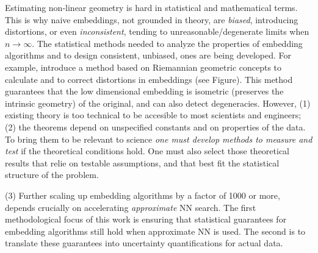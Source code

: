 \documentclass[floatfix,11pt]{article}
\begin{document}
Estimating non-linear geometry is hard in statistical and mathematical terms. This is why na{i}ve embeddings, not grounded in theory, are {\em biased}, introducing distortions, or even {\em inconsistent}, tending to unreasonable/degenerate limits when $n\rightarrow \infty$. The statistical methods needed to analyze the properties of embedding algorithms and to design consistent, unbiased, ones are being developed. For example, \cite{2013arXiv1305.7255P} introduce a method based on Riemannian geometric concepts to calculate and to correct distortions in embeddings (see Figure). This method guarantees that the low dimensional embedding is isometric (preserves the intrinsic geometry) of the original, and can also detect degeneracies. 
However, (1) existing theory is too technical to be accesible to most scientists and engineers; (2) the theorems depend on unspecified constants and on properties of the data. To bring them to be relevant to science {\em one must develop methods to measure and test} if the theoretical conditions hold. One must also select those theoretical results that relie on testable assumptions, and that best fit the statistical structure of the problem. 


(3) Further scaling up embedding algorithms by a factor of 1000 or more, depends crucially on accelerating {\em approximate} NN \cite{charikarKapralovNouriSiminelakis:kde20} search. The first methodological focus of this work is ensuring that statistical guarantees for embedding algorithms still hold when approximate NN is used. The second is to translate these guarantees into uncertainty quantifications for actual data. 
\end{document}
